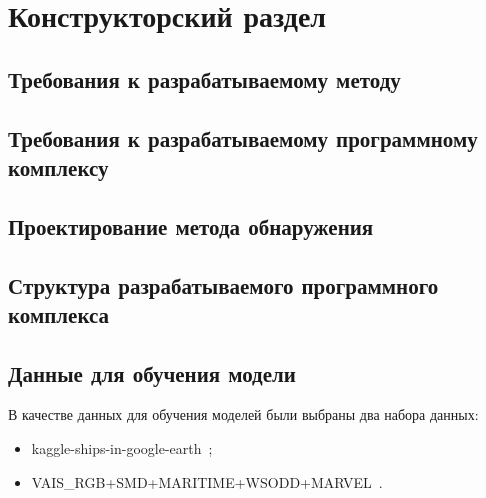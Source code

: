 \chapter{Конструкторский раздел}

\section{Требования к разрабатываемому методу}

\section{Требования к разрабатываемому программному комплексу}

\section{Проектирование метода обнаружения}

\section{Структура разрабатываемого программного комплекса}

\section{Данные для обучения модели}

В качестве данных для обучения моделей были выбраны два набора данных:
\begin{itemize}[label=---]
    \item kaggle-ships-in-google-earth~\cite{kaggle-ships-in-google-earth-dfqwt_dataset};
    \item VAIS\_RGB+SMD+MARITIME+WSODD+MARVEL~\cite{vais_rgb-smd-maritime-wsodd-marvel_dataset}.
\end{itemize}
